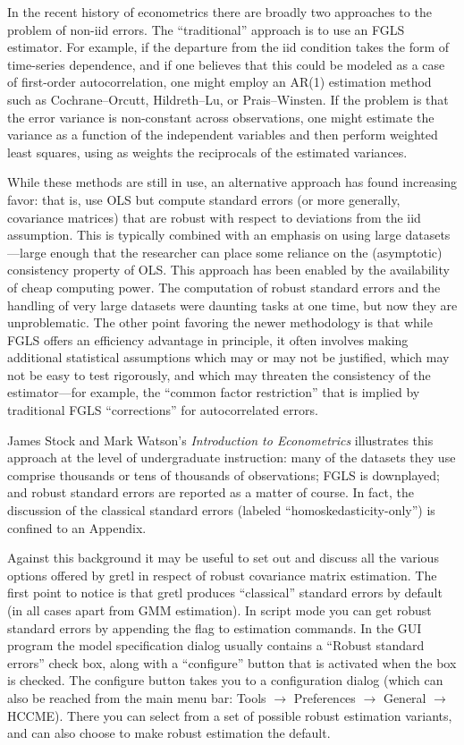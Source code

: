 In the recent history of econometrics there are broadly two approaches
to the problem of non-iid errors.  The ``traditional'' approach is to
use an FGLS estimator.  For example, if the departure from the iid
condition takes the form of time-series dependence, and if one
believes that this could be modeled as a case of first-order
autocorrelation, one might employ an AR(1) estimation method such as
Cochrane--Orcutt, Hildreth--Lu, or Prais--Winsten.  If the problem is
that the error variance is non-constant across observations, one might
estimate the variance as a function of the independent variables and
then perform weighted least squares, using as weights the reciprocals
of the estimated variances.

While these methods are still in use, an alternative approach has
found increasing favor: that is, use OLS but compute standard errors
(or more generally, covariance matrices) that are robust with respect
to deviations from the iid assumption.  This is typically combined
with an emphasis on using large datasets---large enough that the
researcher can place some reliance on the (asymptotic) consistency
property of OLS.  This approach has been enabled by the availability
of cheap computing power.  The computation of robust standard errors
and the handling of very large datasets were daunting tasks at one
time, but now they are unproblematic.  The other point favoring the
newer methodology is that while FGLS offers an efficiency advantage in
principle, it often involves making additional statistical assumptions
which may or may not be justified, which may not be easy to test
rigorously, and which may threaten the consistency of the
estimator---for example, the ``common factor restriction'' that is
implied by traditional FGLS ``corrections'' for autocorrelated errors.

James Stock and Mark Watson's \textit{Introduction to Econometrics}
illustrates this approach at the level of undergraduate instruction:
many of the datasets they use comprise thousands or tens of thousands
of observations; FGLS is downplayed; and robust standard errors are
reported as a matter of course.  In fact, the discussion of the
classical standard errors (labeled ``homoskedasticity-only'') is
confined to an Appendix.

Against this background it may be useful to set out and discuss all
the various options offered by gretl in respect of robust
covariance matrix estimation.  The first point to notice is that
gretl produces ``classical'' standard errors by default (in all
cases apart from GMM estimation).  In script mode you can get robust
standard errors by appending the  flag to estimation
commands.  In the GUI program the model specification dialog usually
contains a ``Robust standard errors'' check box, along with a
``configure'' button that is activated when the box is checked.  The
configure button takes you to a configuration dialog (which can also
be reached from the main menu bar: Tools $\rightarrow$ Preferences
$\rightarrow$ General $\rightarrow$ HCCME).  There you can select from
a set of possible robust estimation variants, and can also choose to
make robust estimation the default.

